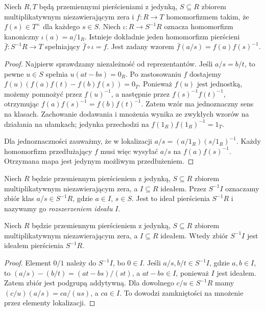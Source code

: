 \begin{twierdzenie}
\label{aa:tw:localization-universal}
Niech $R,T$ będą przemiennymi pierścieniami z jedynką,
$S\subseteq R$ zbiorem multiplikatywnym niezawierającym
zera i $f:R\to T$ homomorfizmem takim, że
$f(s)\in T^\times$ dla każdego $s\in S$.
Niech $\iota:R\to S^{-1}R$ oznacza homomorfizm
kanoniczny $\iota(a)=a/1_R$. Istnieje dokładnie jeden
homomorfizm pierścieni $\bar f:S^{-1}R\to T$
spełniający $\bar f\circ\iota=f$.
Jest zadany wzorem $\bar f(a/s)=f(a)f(s)^{-1}$.
\end{twierdzenie}
\begin{proof}
Najpierw sprawdzamy niezależność od reprezentantów.
Jeśli $a/s=b/t$, to pewne $u\in S$ spełnia
$u(at-bs)=0_R$. Po zastosowaniu $f$ dostajemy
$f(u)(f(a)f(t)-f(b)f(s))=0_T$.
Ponieważ $f(u)$ jest jednostką, możemy pomnożyć
przez $f(u)^{-1}$, a następnie przez
$f(s)^{-1}f(t)^{-1}$, otrzymując
$f(a)f(s)^{-1}=f(b)f(t)^{-1}$.
Zatem wzór ma jednoznaczny sens na klasach.
Zachowanie dodawania i mnożenia wynika ze zwykłych
wzorów na działania na ułamkach; jedynka przechodzi
na $f(1_R)f(1_R)^{-1}=1_T$.

Dla jednoznaczności zauważmy, że w lokalizacji
$a/s=(a/1_R)(s/1_R)^{-1}$.
Każdy homomorfizm przedłużający $f$ musi więc
wysyłać $a/s$ na $f(a)f(s)^{-1}$. Otrzymana mapa
jest jedynym możliwym przedłużeniem.
\end{proof}

\begin{definicja}
\label{aa:def:ideal-extension-local}
Niech $R$ będzie przemiennym pierścieniem z jedynką,
$S\subseteq R$ zbiorem multiplikatywnym niezawierającym
zera, a $I\subseteq R$ ideałem. Przez $S^{-1}I$ oznaczamy
zbiór klas $a/s\in S^{-1}R$,
gdzie $a\in I$, $s\in S$. Jest to ideał pierścienia
$S^{-1}R$ i nazywamy go \emph{rozszerzeniem ideału} $I$.
\end{definicja}
\begin{lemat}
\label{aa:lem:local-ideal-is-ideal}
Niech $R$ będzie przemiennym pierścieniem z jedynką,
$S\subseteq R$ zbiorem multiplikatywnym niezawierającym
zera, a $I\subseteq R$ ideałem. Wtedy zbiór $S^{-1}I$
jest ideałem pierścienia $S^{-1}R$.
\end{lemat}
\begin{proof}
Element $0/1$ należy do $S^{-1}I$, bo $0\in I$.
Jeśli $a/s,b/t\in S^{-1}I$, gdzie $a,b\in I$, to
$(a/s)-(b/t)=(at-bs)/(st)$, a $at-bs\in I$,
ponieważ $I$ jest ideałem. Zatem zbiór jest podgrupą
addytywną. Dla dowolnego $c/u\in S^{-1}R$ mamy
$(c/u)(a/s)=ca/(us)$, a $ca\in I$.
To dowodzi zamkniętości na mnożenie przez elementy lokalizacji.
\end{proof}

